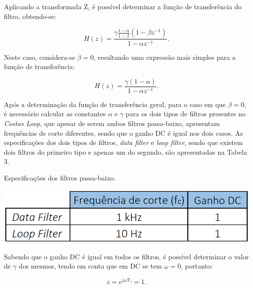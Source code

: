 \documentclass[11pt]{article}
\numberwithin{equation}{section}
\begin{document}
Aplicando a transformada Z, é possível determinar a função de transferência do filtro, obtendo-se:

\vspace{-3mm}
\begin{equation}
H(z) = \frac{\gamma \frac{1-\alpha}{1-\beta} (1-\beta z^{-1})}{1-\alpha z^{-1}}.
\end{equation}
 
\vspace{1mm}
Neste caso, considera-se $\beta=0$, resultando uma expressão mais simples para a função de transferência:
 
\vspace{-3mm}
\begin{equation}
H(z) = \frac{\gamma(1-\alpha)}{1-\alpha z^{-1}}.
\end{equation} 

\vspace{1mm}
Após a determinação da função de transferência geral, para o caso em que $\beta = 0$, é necessário calcular as constantes $\alpha$ e $\gamma$ para os dois tipos de filtros presentes no \textit{Costas Loop}, que apesar de serem ambos filtros passa-baixo, apresentam frequências de corte diferentes, sendo que o ganho DC é igual nos dois casos. As especificações dos dois tipos de filtros, \textit{data filter} e \textit{loop filter}, sendo que existem dois filtros do primeiro tipo e apenas um do segundo, são apresentadas na Tabela 3. 

\begin{table}[H]
 	\centering
 	\caption{Especificações dos filtros passa-baixo.}
 	\vspace{-1.5mm}
 	\includegraphics[keepaspectratio=true, scale=0.35]{tabelas/especificacoes}
\end{table}

Sabendo que o ganho DC é igual em todos os filtros, é possível determinar o valor de $\gamma$ dos mesmos, tendo em conta que em DC se tem $\omega = 0$, portanto:

\vspace{-3mm}
\begin{equation}
	z = e^{j \omega T_s} = 1.
\end{equation}
\end{document}
